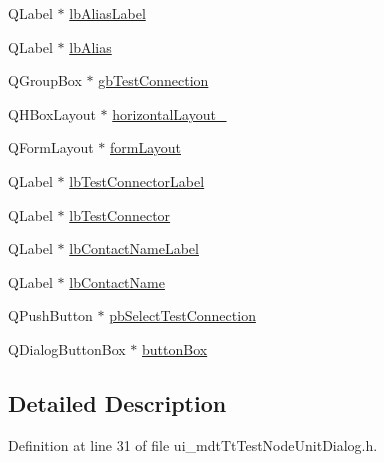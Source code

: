 \begin{DoxyCompactItemize}
\item 
Q\-Label $\ast$ \hyperlink{class_ui__mdt_tt_test_node_unit_dialog_af4046ea35c18a8e70ea103ef57b4f96e}{lb\-Alias\-Label}
\item 
Q\-Label $\ast$ \hyperlink{class_ui__mdt_tt_test_node_unit_dialog_aee2e3ded4edb11000a66a07b23a1c672}{lb\-Alias}
\item 
Q\-Group\-Box $\ast$ \hyperlink{class_ui__mdt_tt_test_node_unit_dialog_a52009f8a3ce093700f617b32e0b7365a}{gb\-Test\-Connection}
\item 
Q\-H\-Box\-Layout $\ast$ \hyperlink{class_ui__mdt_tt_test_node_unit_dialog_af6e88195fbfdaa9840013e51acfbc08d}{horizontal\-Layout\-\_}
\item 
Q\-Form\-Layout $\ast$ \hyperlink{class_ui__mdt_tt_test_node_unit_dialog_a1509ad244b3d1fa72d05270ecadda8d2}{form\-Layout}
\item 
Q\-Label $\ast$ \hyperlink{class_ui__mdt_tt_test_node_unit_dialog_a93fba00c355dabfb4a70b534d764ca1f}{lb\-Test\-Connector\-Label}
\item 
Q\-Label $\ast$ \hyperlink{class_ui__mdt_tt_test_node_unit_dialog_ac90e12715134bda7ce7edb5fc2266b8a}{lb\-Test\-Connector}
\item 
Q\-Label $\ast$ \hyperlink{class_ui__mdt_tt_test_node_unit_dialog_a584b745c81d5bcfe7fa7de1997479762}{lb\-Contact\-Name\-Label}
\item 
Q\-Label $\ast$ \hyperlink{class_ui__mdt_tt_test_node_unit_dialog_a653f666fdae7f899f0435416d3a342f1}{lb\-Contact\-Name}
\item 
Q\-Push\-Button $\ast$ \hyperlink{class_ui__mdt_tt_test_node_unit_dialog_a58543efcb6478cc2c4fe3d60e747af3a}{pb\-Select\-Test\-Connection}
\item 
Q\-Dialog\-Button\-Box $\ast$ \hyperlink{class_ui__mdt_tt_test_node_unit_dialog_a67fc67717c90226a0712221b6ab58393}{button\-Box}
\end{DoxyCompactItemize}


\subsection{Detailed Description}


Definition at line 31 of file ui\-\_\-mdt\-Tt\-Test\-Node\-Unit\-Dialog.\-h.



